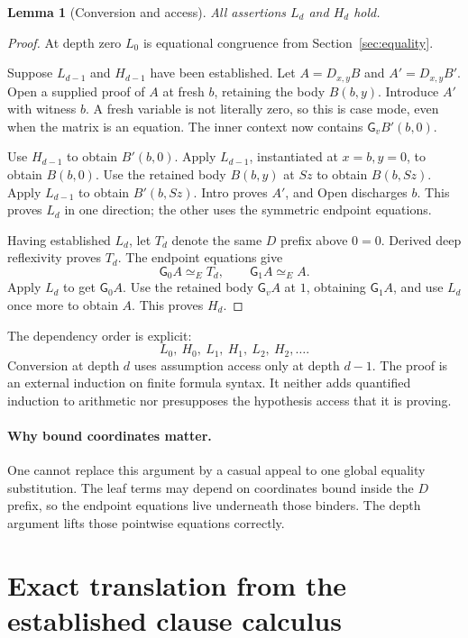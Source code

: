 \documentclass[11pt]{article}
\newtheorem{lemma}[theorem]{Lemma}
\theoremstyle{definition}
\theoremstyle{remark}
\newcommand{\gate}{\mathsf{G}}
\newcommand{\eqvE}{\mathrel{\simeq_E}}
\begin{document}
\begin{lemma}[Conversion and access]
All assertions $L_d$ and $H_d$ hold.
\end{lemma}
\begin{proof}
At depth zero $L_0$ is equational congruence from
Section~\ref{sec:equality}.

Suppose $L_{d-1}$ and $H_{d-1}$ have been established. Let
$A=D_{x,y}B$ and $A'=D_{x,y}B'$. Open a supplied proof of $A$ at fresh
$b$, retaining the body $B(b,y)$. Introduce $A'$ with witness $b$.
A fresh variable is not literally zero, so this is case mode, even when
the matrix is an equation. The inner context now contains
$\gate_v B'(b,0)$.

Use $H_{d-1}$ to obtain $B'(b,0)$. Apply $L_{d-1}$, instantiated at
$x=b,y=0$, to obtain $B(b,0)$. Use the retained body $B(b,y)$ at $Sz$ to
obtain $B(b,Sz)$. Apply $L_{d-1}$ to obtain $B'(b,Sz)$. Intro proves
$A'$, and Open discharges $b$. This proves $L_d$ in one direction; the
other uses the symmetric endpoint equations.

Having established $L_d$, let $T_d$ denote the same $D$ prefix above
$0=0$. Derived deep reflexivity proves $T_d$. The endpoint equations give
\[
 \gate_0 A\eqvE T_d,\qquad \gate_1 A\eqvE A.
\]
Apply $L_d$ to get $\gate_0 A$. Use the retained body $\gate_v A$ at
$1$, obtaining $\gate_1 A$, and use $L_d$ once more to obtain $A$.
This proves $H_d$.
\end{proof}

The dependency order is explicit:
\[
                  L_0,\ H_0,\ L_1,\ H_1,\ L_2,\ H_2,\ldots.
\]
Conversion at depth $d$ uses assumption access only at depth $d-1$.
The proof is an external induction on finite formula syntax. It neither
adds quantified induction to arithmetic nor presupposes the hypothesis
access that it is proving.

\paragraph{Why bound coordinates matter.}
One cannot replace this argument by a casual appeal to one global
equality substitution. The leaf terms may depend on coordinates bound
inside the $D$ prefix, so the endpoint equations live underneath those
binders. The depth argument lifts those pointwise equations correctly.

\section{Exact translation from the established clause calculus}
\label{sec:complete}
\end{document}
